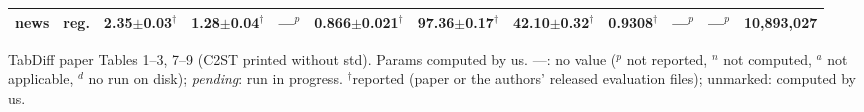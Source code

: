\begin{table}[t]
{\begin{tabular}{llcccccccccc}
news & reg. & 2.35{\scriptsize$\pm$0.03}$^\dagger$ & 1.28{\scriptsize$\pm$0.04}$^\dagger$ & ---$^{p}$ & 0.866{\scriptsize$\pm$0.021}$^\dagger$ & 97.36{\scriptsize$\pm$0.17}$^\dagger$ & 42.10{\scriptsize$\pm$0.32}$^\dagger$ & 0.9308$^\dagger$ & ---$^{p}$ & ---$^{p}$ & 10{,}893{,}027 \\
\bottomrule
\end{tabular}}
\par\smallskip\footnotesize TabDiff paper Tables 1--3, 7--9 (C2ST printed without std). Params computed by us. ---: no value ($^{p}$ not reported, $^{n}$ not computed, $^{a}$ not applicable, $^{d}$ no run on disk); \emph{pending}: run in progress. $^\dagger$reported (paper or the authors' released evaluation files); unmarked: computed by us.
\end{table}

